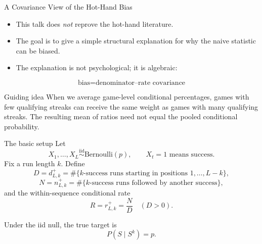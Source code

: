 \documentclass[aspectratio=169,professionalfonts]{beamer}
\begin{document}
\begin{frame}{A Covariance View of the Hot-Hand Bias}
\begin{itemize}
  \item This talk does \emph{not} reprove the hot-hand literature.
  \item The goal is to give a simple structural explanation for why the naive statistic can be biased.
  \item The explanation is not psychological; it is algebraic:
\end{itemize}

\vspace{0.35cm}
\[
  \boxed{
  \text{bias}
  =
  \text{denominator--rate covariance}
  }
\]

\vspace{0.35cm}
\begin{block}{Guiding idea}
When we average game-level conditional percentages, games with few qualifying streaks
can receive the same weight as games with many qualifying streaks. The resulting mean of ratios
need not equal the pooled conditional probability.
\end{block}
\end{frame}

\begin{frame}{The basic setup}
Let
\[
X_1,\dots,X_L \overset{\text{iid}}{\sim} \text{Bernoulli}(p),
\qquad X_t=1 \text{ means success}.
\]
Fix a run length $k$. Define
\[
D=d_{L,k}^{+}
=
\#\{\text{$k$-success runs starting in positions }1,\dots,L-k\},
\]
\[
N=n_{L,k}^{+}
=
\#\{\text{$k$-success runs followed by another success}\},
\]
and the within-sequence conditional rate
\[
R=r_{L,k}^{+}=\frac{N}{D}\quad(D>0).
\]

\vspace{0.2cm}
Under the iid null, the true target is
\[
P(S\mid S^k)=p.
\]
\end{frame}
\end{document}
